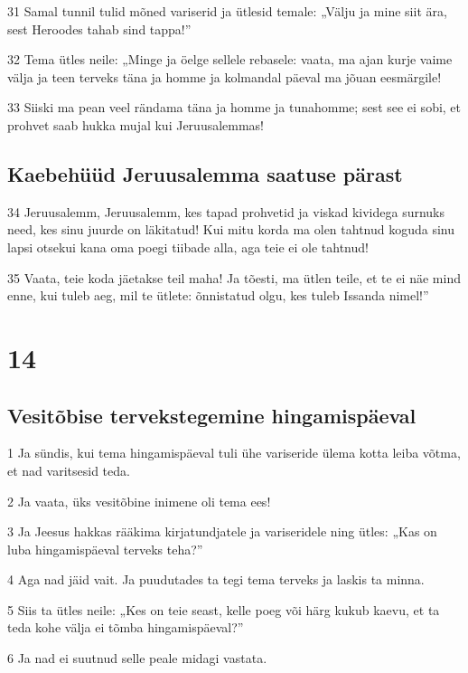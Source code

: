 \par 31 Samal tunnil tulid mõned variserid ja ütlesid temale: „Välju ja mine siit ära, sest Heroodes tahab sind tappa!”
\par 32 Tema ütles neile: „Minge ja öelge sellele rebasele: vaata, ma ajan kurje vaime välja ja teen terveks täna ja homme ja kolmandal päeval ma jõuan eesmärgile!
\par 33 Siiski ma pean veel rändama täna ja homme ja tunahomme; sest see ei sobi, et prohvet saab hukka mujal kui Jeruusalemmas!

\section*{Kaebehüüd Jeruusalemma saatuse pärast}

\par 34 Jeruusalemm, Jeruusalemm, kes tapad prohvetid ja viskad kividega surnuks need, kes sinu juurde on läkitatud! Kui mitu korda ma olen tahtnud koguda sinu lapsi otsekui kana oma poegi tiibade alla, aga teie ei ole tahtnud!
\par 35 Vaata, teie koda jäetakse teil maha! Ja tõesti, ma ütlen teile, et te ei näe mind enne, kui tuleb aeg, mil te ütlete: õnnistatud olgu, kes tuleb Issanda nimel!”


\chapter{14}

\section*{Vesitõbise tervekstegemine hingamispäeval}

\par 1 Ja sündis, kui tema hingamispäeval tuli ühe variseride ülema kotta leiba võtma, et nad varitsesid teda.
\par 2 Ja vaata, üks vesitõbine inimene oli tema ees!
\par 3 Ja Jeesus hakkas rääkima kirjatundjatele ja variseridele ning ütles: „Kas on luba hingamispäeval terveks teha?”
\par 4 Aga nad jäid vait. Ja puudutades ta tegi tema terveks ja laskis ta minna.
\par 5 Siis ta ütles neile: „Kes on teie seast, kelle poeg või härg kukub kaevu, et ta teda kohe välja ei tõmba hingamispäeval?”
\par 6 Ja nad ei suutnud selle peale midagi vastata.

